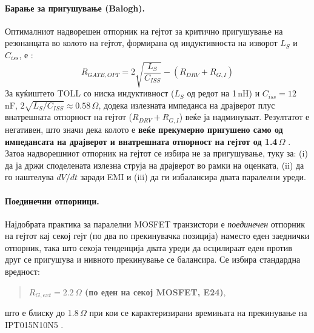 \documentclass[11pt,a4paper]{article}
\begin{document}
\paragraph{Барање за пригушување (Balogh).} Оптималниот надворешен отпорник на гејтот за критично пригушување на резонанцата во колото на гејтот, формирана од индуктивноста на изворот $L_S$ и $C_{iss}$, е \cite{ref5}:
\begin{equation}
R_{GATE,OPT} = 2\sqrt{\frac{L_S}{C_{ISS}}} - (R_{DRV} + R_{G,I})
\end{equation}
За куќиштето TOLL со ниска индуктивност ($L_S$ од редот на 1\,nH) и $C_{iss}=12$\,nF, $2\sqrt{L_S/C_{ISS}} \approx 0.58\,\Omega$, додека излезната импеданса на драјверот плус внатрешната отпорност на гејтот ($R_{DRV}+R_{G,I}$) веќе ја надминуваат. Резултатот е негативен, што значи дека колото е \textbf{веќе прекумерно пригушено само од импедансата на драјверот и внатрешната отпорност на гејтот од 1.4\,$\Omega$} \cite{ref5,ref1}. Затоа надворешниот отпорник на гејтот се избира не за пригушување, туку за: (i) да ја држи споделената излезна струја на драјверот во рамки на оценката, (ii) да го наштелува $dV/dt$ заради EMI и (iii) да ги избалансира двата паралелни уреди.

\paragraph{Поединечни отпорници.} Најдобрата практика за паралелни MOSFET транзистори е \emph{поединечен} отпорник на гејтот кај секој гејт (по два по прекинувачка позиција) наместо еден заеднички отпорник, така што секоја тенденција двата уреди да осцилираат еден против друг се пригушува и нивното прекинување се балансира. Се избира стандардна вредност:
\begin{quote}
\textbf{$R_{G,ext} = 2.2\,\Omega$ (по еден на секој MOSFET, E24)},
\end{quote}
што е блиску до 1.8\,$\Omega$ при кои се карактеризирани времињата на прекинување на IPT015N10N5 \cite{ref1}.
\end{document}

